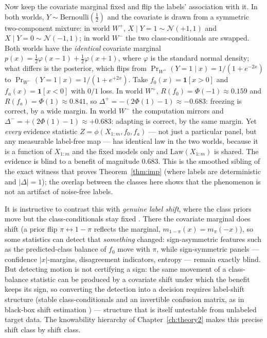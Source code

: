 \begin{example}\label{ex:form-flip}
Now keep the covariate marginal fixed and flip the labels' association with
it. In both worlds, $Y\sim\mathrm{Bernoulli}(\tfrac12)$ and the covariate is
drawn from a symmetric two-component mixture: in world $W^{+}$,
$X\mid Y{=}1\sim\mathcal N(+1,1)$ and $X\mid Y{=}0\sim\mathcal N(-1,1)$;
in world $W^{-}$ the two class-conditionals are swapped. Both worlds have
the \emph{identical} covariate marginal
$p(x)=\tfrac12\varphi(x-1)+\tfrac12\varphi(x+1)$, where $\varphi$ is the
standard normal density; what differs is the posterior, which flips from
$\Pr_{W^+}(Y{=}1\mid x)=1/(1+e^{-2x})$ to
$\Pr_{W^-}(Y{=}1\mid x)=1/(1+e^{+2x})$. Take $f_0(x)=\mathbf1[x>0]$ and
$f_a(x)=\mathbf1[x<0]$ with $0/1$ loss. In world $W^{+}$,
$R(f_0)=\Phi(-1)\approx0.159$ and $R(f_a)=\Phi(1)\approx0.841$, so
$\Delta^{+}=-(2\Phi(1)-1)\approx-0.683$: freezing is correct, by a wide
margin. In world $W^{-}$ the computation mirrors and
$\Delta^{-}=+(2\Phi(1)-1)\approx+0.683$: adapting is correct, by the same
margin. Yet \emph{every} evidence statistic $Z=\phi(X_{1:m},f_0,f_a)$ ---
not just a particular panel, but any measurable label-free map --- has
identical law in the two worlds, because it is a function of $X_{1:m}$ and
the fixed models only and $\mathrm{Law}(X_{1:m})$ is shared. The evidence is
blind to a benefit of magnitude $0.683$. This is the smoothed sibling of the
exact witness that proves Theorem~\ref{thm:imp} (where labels are
deterministic and $|\Delta|=1$); the overlap between the classes here shows
that the phenomenon is not an artifact of noise-free labels.

It is instructive to contrast this with \emph{genuine label shift}, where
the class priors move but the class-conditionals stay fixed
\cite{lipton2018detecting}. There the covariate marginal does shift (a prior
flip $\pi\leftrightarrow1-\pi$ reflects the marginal, $m_{1-\pi}(x)=
m_{\pi}(-x)$), so some statistics can detect that \emph{something} changed:
sign-asymmetric features such as the predicted-class balance of $f_0$ move
with $\pi$, while sign-symmetric panels --- confidence $|x|$-margins,
disagreement indicators, entropy --- remain exactly blind. But detecting
motion is not certifying a sign: the same movement of a class-balance
statistic can be produced by a covariate shift under which the benefit keeps
its sign, so converting the detection into a decision requires label-shift
structure (stable class-conditionals and an invertible confusion matrix, as
in black-box shift estimation \cite{lipton2018detecting}) --- structure that
is itself untestable from unlabeled target data. The knowability hierarchy
of Chapter~\ref{ch:theory2} makes this precise shift class by shift class.
\end{example}

